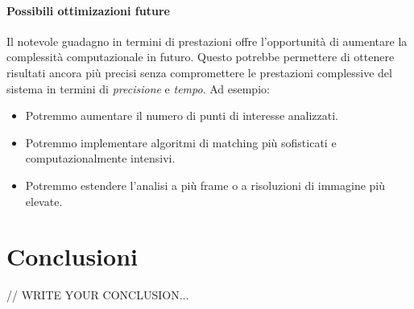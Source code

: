 \documentclass[12pt,a4paper]{report}
\begin{document}
\subsubsection{Possibili ottimizazioni future}

Il notevole guadagno in termini di prestazioni offre l'opportunità di aumentare la complessità computazionale in futuro. Questo potrebbe permettere di ottenere risultati ancora più precisi senza compromettere le prestazioni complessive del sistema in termini di \textit{precisione} e \textit{tempo}. Ad esempio:
\begin{itemize}
\item Potremmo aumentare il numero di punti di interesse analizzati.
\item Potremmo implementare algoritmi di matching più sofisticati e computazionalmente intensivi.
\item Potremmo estendere l'analisi a più frame o a risoluzioni di immagine più elevate.
\end{itemize}



\chapter{Conclusioni}

// WRITE YOUR CONCLUSION...



\end{document}
